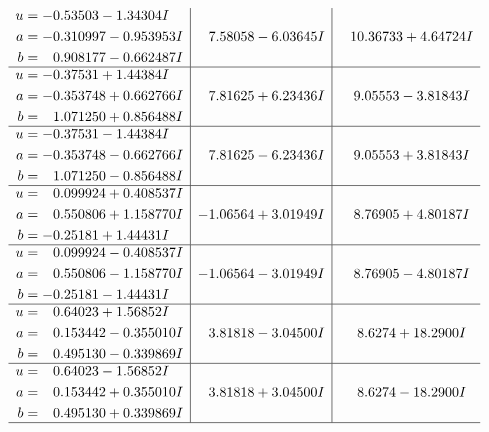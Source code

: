 \documentclass[1p]{elsarticle_modified}
\theoremstyle{definition}
\begin{document}
$$\begin{array}{c|c|c}
\begin{aligned}
u &= -0.53503 - 1.34304 I \\
a &= -0.310997 - 0.953953 I \\
b &= \phantom{-}0.908177 - 0.662487 I\end{aligned}
 & \phantom{-}7.58058 - 6.03645 I & \phantom{-}10.36733 + 4.64724 I \\ \hline\begin{aligned}
u &= -0.37531 + 1.44384 I \\
a &= -0.353748 + 0.662766 I \\
b &= \phantom{-}1.071250 + 0.856488 I\end{aligned}
 & \phantom{-}7.81625 + 6.23436 I & \phantom{-}9.05553 - 3.81843 I \\ \hline\begin{aligned}
u &= -0.37531 - 1.44384 I \\
a &= -0.353748 - 0.662766 I \\
b &= \phantom{-}1.071250 - 0.856488 I\end{aligned}
 & \phantom{-}7.81625 - 6.23436 I & \phantom{-}9.05553 + 3.81843 I \\ \hline\begin{aligned}
u &= \phantom{-}0.099924 + 0.408537 I \\
a &= \phantom{-}0.550806 + 1.158770 I \\
b &= -0.25181 + 1.44431 I\end{aligned}
 & -1.06564 + 3.01949 I & \phantom{-}8.76905 + 4.80187 I \\ \hline\begin{aligned}
u &= \phantom{-}0.099924 - 0.408537 I \\
a &= \phantom{-}0.550806 - 1.158770 I \\
b &= -0.25181 - 1.44431 I\end{aligned}
 & -1.06564 - 3.01949 I & \phantom{-}8.76905 - 4.80187 I \\ \hline\begin{aligned}
u &= \phantom{-}0.64023 + 1.56852 I \\
a &= \phantom{-}0.153442 - 0.355010 I \\
b &= \phantom{-}0.495130 - 0.339869 I\end{aligned}
 & \phantom{-}3.81818 - 3.04500 I & \phantom{-}8.6274 + 18.2900 I \\ \hline\begin{aligned}
u &= \phantom{-}0.64023 - 1.56852 I \\
a &= \phantom{-}0.153442 + 0.355010 I \\
b &= \phantom{-}0.495130 + 0.339869 I\end{aligned}
 & \phantom{-}3.81818 + 3.04500 I & \phantom{-}8.6274 - 18.2900 I\\
 \hline 
 \end{array}$$\newpage\newpage\renewcommand{\arraystretch}{1}
\end{document}
